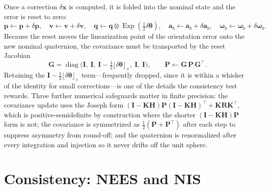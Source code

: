 \documentclass[11pt]{article}
\newcommand{\I}{\mathbf{I}}
\newcommand{\bp}{\mathbf{p}}
\newcommand{\bv}{\mathbf{v}}
\newcommand{\ba}{\mathbf{a}}
\newcommand{\bomega}{\bm{\omega}}
\newcommand{\bq}{\mathbf{q}}
\newcommand{\bK}{\mathbf{K}}
\newcommand{\bH}{\mathbf{H}}
\newcommand{\bP}{\mathbf{P}}
\newcommand{\bx}{\mathbf{x}}
\newcommand{\bG}{\mathbf{G}}
\newcommand{\skewm}[1]{\lfloor #1 \rfloor_\times}
\newcommand{\dtheta}{\delta\bm{\theta}}
\newcommand{\dx}{\delta\bx}
\DeclareMathOperator{\diag}{diag}
\DeclareMathOperator{\Exp}{Exp}
\begin{document}
Once a correction $\dx$ is computed, it is folded into the nominal state and the error is reset to zero:
\begin{equation}
  \bp \leftarrow \bp + \delta\bp,\quad
  \bv \leftarrow \bv + \delta\bv,\quad
  \bq \leftarrow \bq\otimes\Exp\!\left(\tfrac12\dtheta\right),\quad
  \ba_b \leftarrow \ba_b + \delta\ba_b,\quad
  \bomega_b \leftarrow \bomega_b + \delta\bomega_b .
\end{equation}
Because the reset moves the linearization point of the orientation error onto the new nominal
quaternion, the covariance must be transported by the reset Jacobian
\begin{equation}
  \bG = \diag\!\big(\I,\ \I,\ \I-\tfrac12\skewm{\dtheta},\ \I,\ \I\big),
  \qquad \bP \leftarrow \bG\,\bP\,\bG^{\!\top}.
\end{equation}
Retaining the $\I-\tfrac12\skewm{\dtheta}$ term---frequently dropped, since it is within a whisker of
the identity for small corrections---is one of the details the consistency test rewards. Three further
numerical safeguards matter in finite precision: the covariance update uses the Joseph form
$(\I-\bK\bH)\bP(\I-\bK\bH)^{\!\top}+\bK\mathbf{R}\bK^{\!\top}$, which is positive-semidefinite by
construction where the shorter $(\I-\bK\bH)\bP$ form is not; the covariance is symmetrized as
$\tfrac12(\bP+\bP^{\!\top})$ after each step to suppress asymmetry from round-off; and the quaternion is
renormalized after every integration and injection so it never drifts off the unit sphere.

\section{Consistency: NEES and NIS}
\label{sec:nees}
\end{document}
